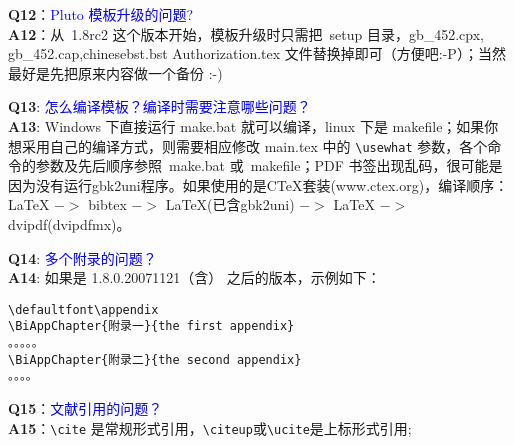 \noindent \textbf{Q12}：\textcolor{blue}{Pluto 模板升级的问题?}\\
\textbf{A12}：从~1.8rc2 这个版本开始，模板升级时只需把~setup 目录，gb\_452.cpx, gb\_452.cap,chinesebst.bst Authorization.tex 文件替换掉即可（方便吧:-P）；当然最好是先把原来内容做一个备份 :-)

\noindent \textbf{Q13}: \textcolor{blue}{怎么编译模板？编译时需要注意哪些问题？}\\
\textbf{A13}: Windows 下直接运行 make.bat 就可以编译，linux 下是 makefile；如果你想采用自己的编译方式，则需要相应修改 main.tex 中的 \verb+\usewhat+ 参数，各个命令的参数及先后顺序参照~make.bat 或~makefile；PDF 书签出现乱码，很可能是因为没有运行gbk2uni程序。如果使用的是CTeX套装(www.ctex.org)，编译顺序：LaTeX $->$ bibtex $->$ LaTeX(已含gbk2uni) $->$ LaTeX $->$dvipdf(dvipdfmx)。

\noindent \textbf{Q14}: \textcolor{blue}{多个附录的问题？}\\
\textbf{A14}: 如果是 1.8.0.20071121（含） 之后的版本，示例如下：
\begin{verbatim}
\defaultfont\appendix
\BiAppChapter{附录一}{the first appendix}
。。。。。
\BiAppChapter{附录二}{the second appendix}
。。。。
\end{verbatim}

\noindent \textbf{Q15}：\textcolor{blue}{文献引用的问题？ }\\
\textbf{A15}：\verb+\cite+ 是常规形式引用，\verb+\citeup+或\verb+\ucite+是上标形式引用;

